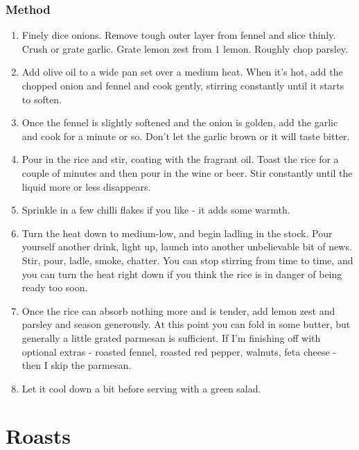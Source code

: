 \documentclass[]{article}
\begin{document}
\subsubsection*{\Large Method}
\begin{enumerate}[font=\huge\color{accent}]
	\item Finely dice onions. Remove tough outer layer from fennel and slice thinly. Crush or grate garlic. Grate lemon zest from 1 lemon. Roughly chop parsley.
	\item Add olive oil to a wide pan set over a medium heat. When it's hot, add the chopped onion and fennel and cook gently, stirring constantly until it starts to soften.
	\item Once the fennel is slightly softened and the onion is golden, add the garlic and cook for a minute or so. Don’t let the garlic brown or it will taste bitter.
	\item Pour in the rice and stir, coating with the fragrant oil. Toast the rice for a couple of minutes and then pour in the wine or beer. Stir constantly until the liquid more or less disappears.
	\item Sprinkle in a few chilli flakes if you like - it adds some warmth.
	\item Turn the heat down to medium-low, and begin ladling in the stock. Pour yourself another drink, light up, launch into another unbelievable bit of news. Stir, pour, ladle, smoke, chatter. You can stop stirring from time to time, and you can turn the heat right down if you think the rice is in danger of being ready too soon.
	\item Once the rice can absorb nothing more and is tender, add lemon zest and parsley and season generously. At this point you can fold in some butter, but generally a little grated parmesan is sufficient. If I’m finishing off with optional extras - roasted fennel, roasted red pepper, walnuts, feta cheese - then I skip the parmesan. 
	\item Let it cool down a bit before serving with a green salad.  
\end{enumerate}
\newpage
{}
\section*{\center\Huge\color{accent}Roasts}
\label{cat:Roasts}
\label{rec:Potato Gratin}
\end{document}
